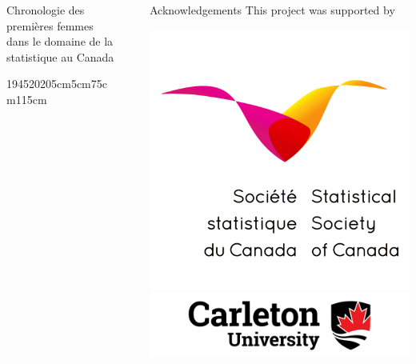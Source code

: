 \documentclass[final]{beamer}
\newlength{\sepwid}
\newlength{\onecolwid}
\newlength{\threecolwid}
\begin{document}
\begin{frame}[t]
\begin{columns}[t]
\begin{column}{\threecolwid}
\begin{block}{Chronologie des premières femmes dans le domaine de la statistique au Canada}
\begin{timeline}{1945}{2020}{5cm}{5cm}{75cm}{115cm}
				\end{timeline}
			\end{block}
		\end{column}
		\begin{column}{\sepwid}\end{column}			%
		\begin{column}{\onecolwid}
			\begin{block}{Acknowledgements}
				This project was supported by 
				\begin{center}
					\includegraphics[width=5in]{SSC.png}
					\includegraphics[width=7in]{carleton.jpg}

\end{center}
\end{block}
\end{column}
\end{columns}
\end{frame}
\end{document}
